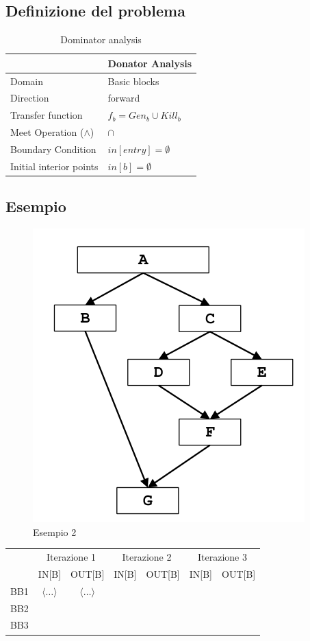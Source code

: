 \documentclass[10pt,a4paper]{article}
\begin{document}
\subsection{Definizione del problema}
\begin{table}[h!]
  \centering
  \begin{tabular}{|l|p{4cm}|}
    \hline
    \textbf{} & \textbf{Donator Analysis} \\
    \hline
    Domain & Basic blocks\\
    \hline
    Direction & forward\\
    \hline
    Transfer function & $f_b = Gen_b \cup Kill_b$\\
    \hline
    Meet Operation (\(\land\)) & $\cap$ \\
    \hline
    Boundary Condition & $in[entry] = \emptyset $\\
    \hline
    Initial interior points & $in[b] = \emptyset $ \\
    \hline
  \end{tabular}
  \caption{Dominator analysis}
\end{table}

\subsection{Esempio}
\begin{figure}[h]
  \centering
  \includegraphics[width=.5\textwidth]{example-2.png}
  \caption{Esempio 2}
\end{figure}
\begin{table}[h!]
\centering
\renewcommand{\arraystretch}{1.5}
\begin{tabular}{|c|c|c|c|c|c|c|}
\hline
\rowcolor{blue!30}
 & \multicolumn{2}{c|}{Iterazione 1} & \multicolumn{2}{c|}{Iterazione 2} & \multicolumn{2}{c|}{Iterazione 3} \\
\rowcolor{blue!30}
 & IN[B] & OUT[B] & IN[B] & OUT[B] & IN[B] & OUT[B] \\
\hline
BB1 & $\langle \ldots \rangle$ & $\langle \ldots \rangle$ & & & & \\
\hline
BB2 & & & & & & \\
\hline
BB3 & & & & & & \\
\hline
\end{tabular}
\end{table}
\end{document}
